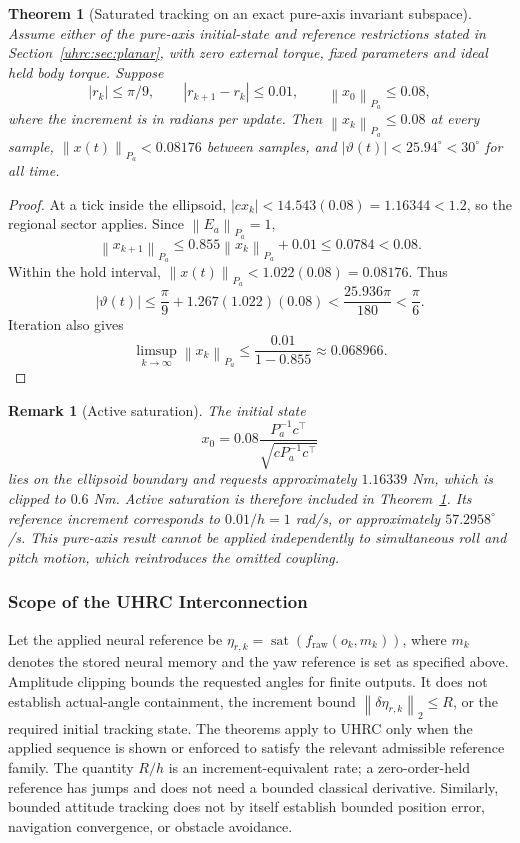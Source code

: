 \documentclass[12pt, a4paper]{article}
\newtheorem{theorem}{Theorem}
\newtheorem{remark}{Remark}
\begin{document}
\begin{theorem}[Saturated tracking on an exact pure-axis invariant subspace]
\label{uhrc:thm:planar}
Assume either of the pure-axis initial-state and reference restrictions stated
in Section~\ref{uhrc:sec:planar}, with zero external torque, fixed parameters and ideal held body torque. Suppose
\[
 |r_k|\le\pi/9,\qquad |r_{k+1}-r_k|\le0.01,\qquad
 \left\lVert x_0\right\rVert_{P_a}\le0.08,
\]
where the increment is in radians per update. Then
$\left\lVert x_k\right\rVert_{P_a}\le0.08$ at every sample,
$\left\lVert x(t)\right\rVert_{P_a}<0.08176$ between samples, and
$|\vartheta(t)|<25.94^\circ<30^\circ$ for all time.
\end{theorem}
\begin{proof}
At a tick inside the ellipsoid,
$|cx_k|<14.543(0.08)=1.16344<1.2$, so the regional sector applies.
Since $\left\lVert E_a\right\rVert_{P_a}=1$,
\[
 \left\lVert x_{k+1}\right\rVert_{P_a}
 \le0.855\left\lVert x_k\right\rVert_{P_a}+0.01
 \le0.0784<0.08.
\]
Within the hold interval,
$\left\lVert x(t)\right\rVert_{P_a}<1.022(0.08)=0.08176$.
Thus
\[
 |\vartheta(t)|
 \le\frac{\pi}{9}+1.267(1.022)(0.08)
 <\frac{25.936\pi}{180}<\frac{\pi}{6}.
\]
Iteration also gives
\[
 \limsup_{k\to\infty}\left\lVert x_k\right\rVert_{P_a}
 \le\frac{0.01}{1-0.855}\approx0.068966.
\]
\end{proof}

\begin{remark}[Active saturation]
The initial state
\[
 x_0=0.08\frac{P_a^{-1}c^\top}{\sqrt{cP_a^{-1}c^\top}}
\]
lies on the ellipsoid boundary and requests approximately $1.16339$ Nm,
which is clipped to $0.6$ Nm. Active saturation is therefore included in
Theorem~\ref{uhrc:thm:planar}. Its reference increment corresponds to
$0.01/h=1$ rad/s, or approximately $57.2958^\circ$/s.
This pure-axis result cannot be applied independently to simultaneous roll
and pitch motion, which reintroduces the omitted coupling.
\end{remark}

\subsubsection{Scope of the UHRC Interconnection}
\label{uhrc:sec:scope}

Let the applied neural reference be
$\eta_{r,k}=\operatorname{sat}(f_{\mathrm{raw}}(o_k,m_k))$, where $m_k$ denotes
the stored neural memory and the yaw reference is set as specified above.
Amplitude clipping bounds the requested angles for finite outputs. It does
not establish actual-angle containment, the increment bound
$\left\lVert \delta\eta_{r,k}\right\rVert_{2}\le R$, or the required initial tracking state.
The theorems apply to UHRC only when the applied sequence is shown or
enforced to satisfy the relevant admissible reference family. 
The quantity $R/h$ is an increment-equivalent rate; a zero-order-held
reference has jumps and does not need a bounded classical derivative.
Similarly, bounded attitude tracking does not by itself establish bounded
position error, navigation convergence, or obstacle avoidance.
\end{document}
